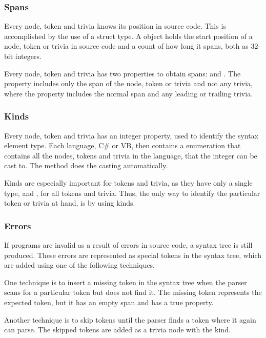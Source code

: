 \subsubsection{Spans}
Every node, token and trivia knows its position in source code. This is accomplished by the use of a  struct type. A  object holds the start position of a node, token or trivia in source code and a count of how long it spans, both as 32-bit integers\cite[p. 8]{ng2012roslyn}.

Every node, token and trivia has two properties to obtain spans:  and . The  property includes only the span of the node, token or trivia and not any trivia, where the  property includes the normal span and any leading or trailing trivia.  

\subsubsection{Kinds}
Every node, token and trivia has an integer  property, used to identify the syntax element type. Each language, C\# or \ac{VB}, then contains a  enumeration that contains all the nodes, tokens and trivia in the language, that the integer can be cast to. The  method does the casting automatically\cite{roslynwikiOverview}\cite[p. 9]{ng2012roslyn}.

Kinds are especially important for tokens and trivia, as they have only a single type, and , for all tokens and trivia. Thus, the only way to identify the particular token or trivia at hand, is by using kinds.

\subsubsection{Errors}
If programs are invalid as a result of errors in source code, a syntax tree is still produced. These errors are represented as special tokens in the syntax tree, which are added using one of the following techniques\cite[p. 9]{ng2012roslyn}.

One technique is to insert a missing token in the syntax tree when the parser scans for a particular token but does not find it. The missing token represents the expected token, but it has an empty span and has a true  property.

Another technique is to skip tokens until the parser finds a token where it again can parse. The skipped tokens are added as a trivia node with the  kind.


